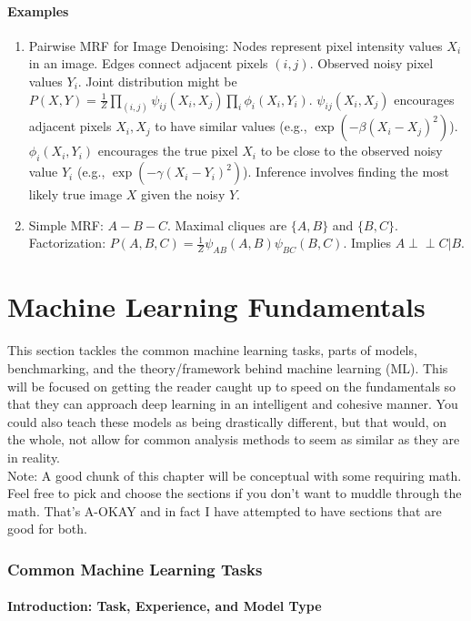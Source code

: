 \documentclass{article}
\newcommand{\Indep}{\perp \!\!\! \perp} %
\begin{document}
\subsection*{Examples}
\begin{enumerate}
    \item Pairwise MRF for Image Denoising:
    Nodes represent pixel intensity values $X_i$ in an image. Edges connect adjacent pixels $(i, j)$. Observed noisy pixel values $Y_i$.
    Joint distribution might be $P(X, Y) = \frac{1}{Z} \prod_{(i,j)} \psi_{ij}(X_i, X_j) \prod_i \phi_i(X_i, Y_i)$.
    $\psi_{ij}(X_i, X_j)$ encourages adjacent pixels $X_i, X_j$ to have similar values (e.g., $\exp(-\beta (X_i-X_j)^2)$).
    $\phi_i(X_i, Y_i)$ encourages the true pixel $X_i$ to be close to the observed noisy value $Y_i$ (e.g., $\exp(-\gamma (X_i-Y_i)^2)$).
    Inference involves finding the most likely true image $X$ given the noisy $Y$.
    \item Simple MRF: $A - B - C$. Maximal cliques are $\{A, B\}$ and $\{B, C\}$.
    Factorization: $P(A, B, C) = \frac{1}{Z} \psi_{AB}(A, B) \psi_{BC}(B, C)$.
    Implies $A \Indep C | B$.
\end{enumerate}




\newpage
\part{Machine Learning Fundamentals}
This section tackles the common machine learning tasks, parts of models, benchmarking, and the theory/framework behind machine learning (ML). This will be focused on getting the reader caught up to speed on the fundamentals so that they can approach deep learning in an intelligent and cohesive manner. You could also teach these models as being drastically different, but that would, on the whole, not allow for common analysis methods to seem as similar as they are in reality. \\
Note: A good chunk of this chapter will be conceptual with some requiring math. Feel free to pick and choose the sections if you don't want to muddle through the math. That's A-OKAY and in fact I have attempted to have sections that are good for both.

\section{Common Machine Learning Tasks}
\subsection{Introduction: Task, Experience, and Model Type}
\end{document}
